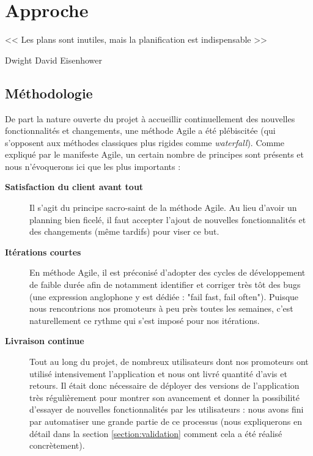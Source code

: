 \chapter{Approche}

\epigraph{<< Les plans sont inutiles, mais la planification est indispensable >>}{Dwight David Eisenhower}

\section{Méthodologie}
\label{section:methodologie}

De part la nature ouverte du projet à accueillir continuellement des nouvelles fonctionnalités et changements, une méthode Agile a été plébiscitée (qui s'opposent aux méthodes classiques plus rigides comme \textit{waterfall}). Comme expliqué par le manifeste Agile\cite{agileManifeste}, un certain nombre de principes sont présents et nous n'évoquerons ici que les plus importants : 

\begin{description}
    \item[\textbf{Satisfaction du client avant tout}] Il s'agit du principe sacro-saint de la méthode Agile\cite{agileManifeste}. Au lieu d'avoir un planning bien ficelé, il faut accepter l'ajout de nouvelles fonctionnalités et des changements (même tardifs) pour viser ce but.
    
    \item[\textbf{Itérations courtes}] En méthode Agile\cite{agileManifeste}, il est préconisé d'adopter des cycles de développement de faible durée afin de notamment identifier et corriger très tôt des bugs (une expression anglophone y est dédiée : "fail fast, fail often"). Puisque nous rencontrions nos promoteurs à peu près toutes les semaines, c'est naturellement ce rythme qui s'est imposé pour nos itérations.
    
    \item[\textbf{Livraison continue}] Tout au long du projet, de nombreux utilisateurs dont nos promoteurs ont utilisé intensivement l'application et nous ont livré quantité d'avis et retours. Il était donc nécessaire de déployer des versions de l'application très régulièrement pour montrer son avancement et donner la possibilité d'essayer de nouvelles fonctionnalités par les utilisateurs : nous avons fini par automatiser une grande partie de ce processus (nous expliquerons en détail dans la section \ref{section:validation} comment cela a été réalisé concrètement).
\end{description}

